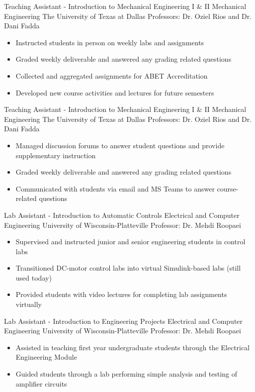 \documentclass[11pt,letterpaper,roman]{moderncv} %
\begin{document}
{Teaching Assistant - Introduction to Mechanical Engineering I \& II}
{Mechanical Engineering}
{The University of Texas at Dallas}
{Professors: Dr. Oziel Rios and Dr. Dani Fadda}
{\begin{itemize}
    \item Instructed students in person on weekly labs and assignments
    \item Graded weekly deliverable and answered any grading related questions
    \item Collected and aggregated assignments for ABET Accreditation
    \item Developed new course activities and lectures for future semesters
\end{itemize}}

{Teaching Assistant - Introduction to Mechanical Engineering I \& II}
{Mechanical Engineering}
{The University of Texas at Dallas}
{Professors: Dr. Oziel Rios and Dr. Dani Fadda}
{\begin{itemize}
    \item Managed discussion forums to answer student questions and provide supplementary instruction
    \item Graded weekly deliverable and answered any grading related questions
    \item Communicated with students via email and MS Teams to answer course-related questions
\end{itemize}
}

{Lab Assistant - Introduction to Automatic Controls}
{Electrical and Computer Engineering}
{University of Wisconsin-Platteville}
{Professor: Dr. Mehdi Roopaei}
{\begin{itemize}
    \item Supervised and instructed junior and senior engineering students in control labs
    \item Transitioned DC-motor control labs into virtual Simulink-based labs (still used today)
    \item Provided students with video lectures for completing lab assignments virtually
\end{itemize}
}

{Lab Assistant - Introduction to Engineering Projects}
{Electrical and Computer Engineering}
{University of Wisconsin-Platteville}
{Professor: Dr. Mehdi Roopaei}
{\begin{itemize}
    \item Assisted in teaching first year undergraduate students through the Electrical Engineering Module
    \item Guided students through a lab performing simple analysis and testing of amplifier circuits
\end{itemize}
}
\end{document}
